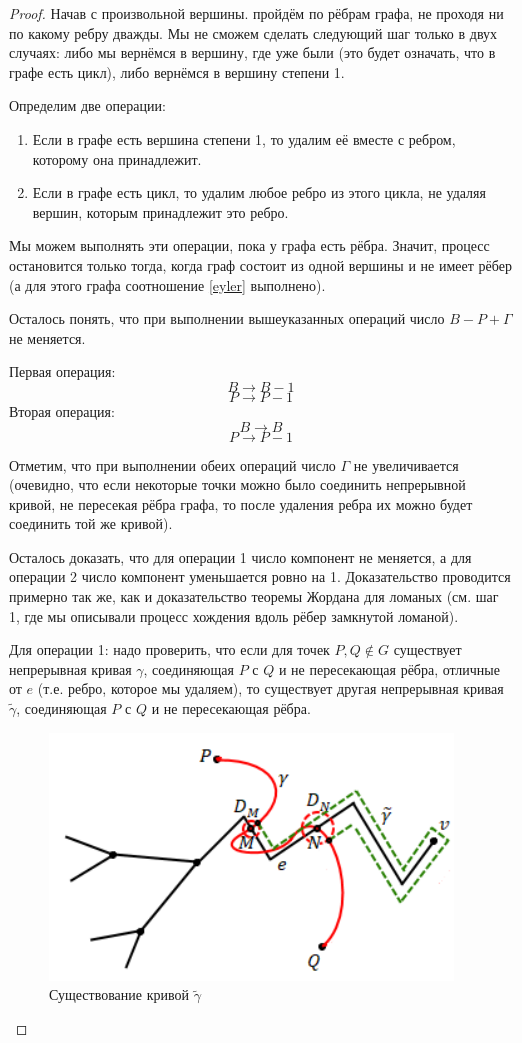 \begin{proof}
    Начав с произвольной вершины. пройдём по рёбрам графа, не проходя ни по какому ребру дважды. Мы не сможем сделать следующий шаг только в двух случаях: либо мы вернёмся в вершину, где уже были (это будет означать, что в графе есть цикл), либо вернёмся в вершину степени 1.

    Определим две операции:
    \begin{enumerate}
        \item Если в графе есть вершина степени 1, то удалим её вместе с ребром, которому она принадлежит.
        \item Если в графе есть цикл, то удалим любое ребро из этого цикла, не удаляя вершин, которым принадлежит это ребро.
    \end{enumerate}

    Мы можем выполнять эти операции, пока у графа есть рёбра. Значит, процесс остановится только тогда, когда граф состоит из одной вершины и не имеет рёбер (а для этого графа соотношение \eqref{eyler} выполнено).

    Осталось понять, что при выполнении вышеуказанных операций число $B - P + \Gamma$ не меняется.

    Первая операция: \[B \to B - 1\] \[P \to P - 1\]
    Вторая операция: \[B \to B\] \[P \to P - 1\]
    
    Отметим, что при выполнении обеих операций число $\Gamma$ не увеличивается (очевидно, что если некоторые точки можно было соединить непрерывной кривой, не пересекая рёбра графа, то после удаления ребра их можно будет соединить той же кривой).

    Осталось доказать, что для операции 1 число компонент не меняется, а для операции 2 число компонент уменьшается ровно на 1. Доказательство проводится примерно так же, как и доказательство теоремы Жордана для ломаных (см. шаг 1, где мы описывали процесс хождения вдоль рёбер замкнутой ломаной).

    Для операции 1: надо проверить, что если для точек $P,Q \notin G$ существует непрерывная кривая $\gamma$, соединяющая $P$ с $Q$ и не пересекающая рёбра, отличные от $e$ (т.е. ребро, которое мы удаляем), то существует другая непрерывная кривая $\tilde{\gamma}$, соединяющая $P$ с $Q$ и не пересекающая рёбра.

    \begin{figure}[h]
        \centering
        \includegraphics[scale=0.8]{images/c6.1.png}
        \caption{Существование кривой $\tilde{\gamma}$}
        \label{fig:c6.1}
    \end{figure}


\end{proof}

